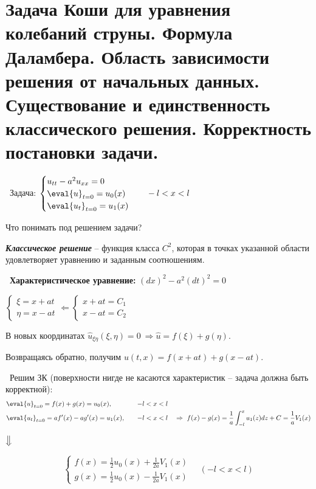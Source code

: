 \documentclass[../main.tex]{subfiles}
\begin{document}
  
\section[Задача Коши для колебаний струны]{Задача Коши для уравнения колебаний струны. Формула Даламбера. Область зависимости решения от начальных данных. Существование и единственность классического решения. Корректность постановки задачи.}
\textbullet\ Задача: \quad $\begin{cases} u_{tt}-a^2u_{xx} = 0\\ \eval{u}_{t=0} = u_0(x)\\ \eval{u_t}_{t=0} = u_1(x)\end{cases}\quad -l<x<l$
\vspace{0.5em}

Что понимать под решением задачи?

\begin{definition} \textbf{\emph{Классическое решение}} -- функция класса $C^2$, которая в точках указанной области удовлетворяет уравнению и заданным соотношениям.
\end{definition}

\textbullet\ {\bf Характеристическое уравнение: } $(dx)^2 - a^2(dt)^2 = 0$

$\begin{cases} \xi = x+at \\ \eta = x-at \end{cases} \Leftarrow \begin{cases} x+at = C_1 \\ x-at = C_2 \end{cases}$

В новых координатах $\hat{u}_{\xi\eta}(\xi,\eta) = 0\ \Rightarrow \hat{u} = f(\xi) + g(\eta) $.

Возвращаясь обратно, получим $u(t,x) = f(x+at) + g(x-at)$.
\vspace{0.4em}

\textbullet\ Решим ЗК (поверхности нигде не касаются характеристик -- задача должна быть корректной):
\begin{equation*}
\begin{aligned}
&\eval{u}_{t=0} = f(x) + g(x) = u_0(x), \quad &-l < x< l&\\
&\eval{u_t}_{t=0} =  af'(x) - ag'(x) = u_1(x), \quad &-l < x < l& \quad \Rightarrow\ f(x) - g(x) = \frac1{a}\int _{-l}^xu_1(z)dz + C = \frac1{a}V_1(x)
\end{aligned}
\end{equation*}
\begin{center}
$\big\Downarrow$
\end{center}
\begin{equation}
\label{eq::5::dalam}
\tag{*}
\begin{cases} f(x) = \frac1{2}u_0(x) + \frac1{2a}V_1(x) \\ g(x) = \frac1{2}u_0(x) - \frac1{2a}V_1(x) \end{cases} \quad (-l < x< l)
\end{equation}
\end{document}
